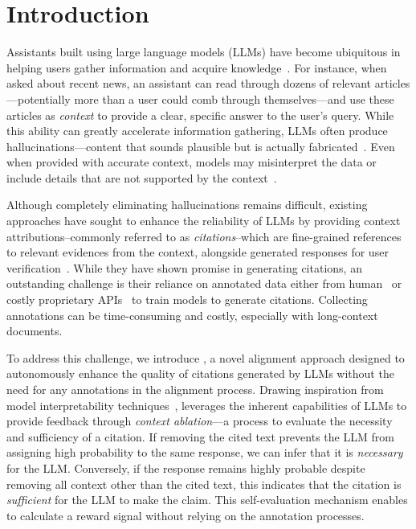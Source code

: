 \section{Introduction}
\label{introduction}

Assistants built using large language models (LLMs) have become ubiquitous in helping users gather information and acquire knowledge~\citep{chatgpt2023,openai2023gpt4}. For instance, when asked about recent news, an assistant can read through dozens of relevant articles---potentially more than a user could comb through themselves---and use these articles as \emph{context} to provide a clear, specific answer to the user's query. While this ability can greatly accelerate information gathering, LLMs often produce hallucinations—content that sounds plausible but is actually fabricated~\citep{ji2023survey}. Even when provided with accurate context, models may misinterpret the data or include details that are not supported by the context~\citep{shi2024trusting, chuang2024lookback}.

Although completely eliminating hallucinations remains difficult, existing approaches have sought to enhance the reliability of LLMs by providing context attributions--commonly referred to as \emph{citations}--which are fine-grained references to relevant evidences from the context, alongside generated responses for user verification~\citep{menick2022teaching, slobodkin2024attribute, zhang2024longcite}. 
While they have shown promise in generating citations, an outstanding challenge is their reliance on annotated data either from human~\citep{menick2022teaching,slobodkin2024attribute} or costly proprietary APIs~\citep{zhang2024longcite,huang2024training} to train models to generate citations. Collecting annotations can be time-consuming and costly, especially with long-context documents.

To address this challenge, we introduce \ours, a novel alignment approach designed to autonomously enhance the quality of citations generated by LLMs without the need for any annotations in the alignment process. 
Drawing inspiration from model interpretability techniques~\citep{lei2016rationalizing,cohen2024contextcite},
\ours leverages the inherent capabilities of LLMs to provide feedback through \emph{context ablation}—a process to evaluate the necessity and sufficiency of a citation.
If removing the cited text prevents the LLM from assigning high probability to the same response, we can infer that it is \emph{necessary} for the LLM. Conversely, if the response remains highly probable despite removing all context other than the cited text, this indicates that the citation is \emph{sufficient} for the LLM to make the claim. This self-evaluation mechanism enables \ours to calculate a reward signal without relying on the annotation processes.

